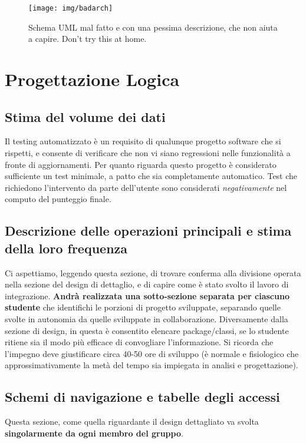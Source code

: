 \documentclass[a4paper,12pt]{report}
\begin{document}
\begin{figure}[h]
\centering{}
\texttt{[image: img/badarch]}
\caption{Schema UML mal fatto e con una pessima descrizione, che non aiuta a capire. Don't try this at home.}
\label{img:badarch}
\end{figure}


\chapter{Progettazione Logica}
\section{Stima del volume dei dati}

Il testing automatizzato è un requisito di qualunque progetto software che si rispetti, e consente di verificare che non vi siano regressioni nelle funzionalità a fronte di aggiornamenti.
%
Per quanto riguarda questo progetto è considerato sufficiente un test minimale, a patto che sia completamente automatico.
%
Test che richiedono l'intervento da parte dell'utente sono considerati \textit{negativamente} nel computo del punteggio finale.


\section{Descrizione delle operazioni principali e stima della loro frequenza}

Ci aspettiamo, leggendo questa sezione, di trovare conferma alla divisione operata nella sezione del design di dettaglio, e di capire come è stato svolto il lavoro di integrazione.
%
\textbf{Andrà realizzata una sotto-sezione separata per ciascuno studente} che identifichi le porzioni di progetto sviluppate, separando quelle svolte in autonomia da quelle sviluppate in collaborazione.
%
Diversamente dalla sezione di design, in questa è consentito elencare package/classi, se lo studente ritiene sia il modo più efficace di convogliare l'informazione.
%
Si ricorda che l'impegno deve giustificare circa 40-50 ore di sviluppo (è normale e fisiologico che approssimativamente la metà del tempo sia impiegata in analisi e progettazione).

\section{Schemi di navigazione e tabelle degli accessi}

Questa sezione, come quella riguardante il design dettagliato va svolta \textbf{singolarmente da ogni membro del gruppo}.
\end{document}
